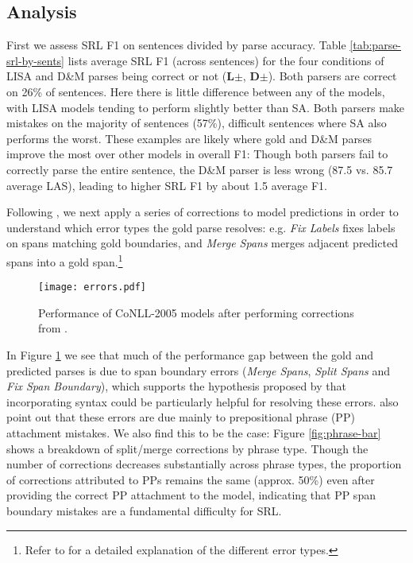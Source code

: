 \documentclass[11pt,a4paper]{article}
\begin{document}
\subsection{Analysis \label{sec:analysis}}



First we assess SRL F1 on sentences divided by parse accuracy. Table \ref{tab:parse-srl-by-sents} lists average SRL F1 (across sentences) for the four conditions of LISA and D\&M parses being correct or not ({\bf L$\pm$}, {\bf D$\pm$}). Both parsers are correct on 26\% of sentences. Here there is little difference between any of the models, with LISA models tending to perform slightly better than SA. Both parsers make mistakes on the majority of sentences (57\%), difficult sentences where SA also performs the worst. These examples are likely where gold and D\&M parses improve the most over other models in overall F1: Though both parsers fail to correctly parse the entire sentence, the D\&M parser is less wrong (87.5 vs. 85.7 average LAS), leading to higher SRL F1 by about 1.5 average F1.

Following \citet{he2017deep}, we next apply a series of corrections to model predictions in order to understand which error types the gold parse resolves: e.g. \emph{Fix Labels} fixes labels on spans matching gold boundaries, and \emph{Merge Spans} merges adjacent predicted spans into a gold span.\footnote{Refer to \citet{he2017deep} for a detailed explanation of the different error types.}

\begin{figure}
\texttt{[image: errors.pdf]}
\caption{Performance of CoNLL-2005 models after performing corrections from \citet{he2017deep}. \label{errors-fig}}
\end{figure}

In Figure \ref{errors-fig} we see that much of the performance gap between the gold and predicted parses is due to span boundary errors (\emph{Merge Spans}, \emph{Split Spans} and \emph{Fix Span Boundary}), which supports the hypothesis proposed by \citet{he2017deep} that incorporating syntax could be particularly helpful for resolving these errors. 
\citet{he2017deep} also point out that these errors are due mainly to prepositional phrase (PP) attachment mistakes. We also find this to be the case: Figure \ref{fig:phrase-bar} shows a breakdown of split/merge corrections by phrase type. Though the number of corrections decreases substantially across phrase types, the proportion of corrections attributed to PPs remains the same (approx. 50\%) even after providing the correct PP attachment to the model, indicating that PP span boundary mistakes are a fundamental difficulty for SRL.
\end{document}
